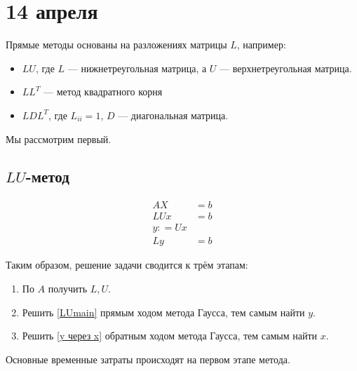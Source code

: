 \chapter{14 апреля}

Прямые методы основаны на разложениях матрицы \(L\), например:
\begin{itemize}
    \item \(LU\), где \(L\) --- нижнетреугольная матрица, а \(U\) --- верхнетреугольная матрица.
    \item \(LL^T\) --- метод квадратного корня
    \item \(LDL^T\), где \(L_{ii} = 1\), \(D\) --- диагональная матрица.
\end{itemize}

Мы рассмотрим первый.

\section{\(LU\)-метод}

\begin{align}
    A X & = b                    \\
    LUx & = b                    \\
    y : = Ux   \label{y через x} \\
    Ly  & = b \label{LUmain}
\end{align}

Таким образом, решение задачи сводится к трём этапам:
\begin{enumerate}
    \item По \(A\) получить \(L, U\).
    \item Решить \eqref{LUmain} прямым ходом метода Гаусса, тем самым найти \(y\).
    \item Решить \eqref{y через x} обратным ходом метода Гаусса, тем самым найти \(x\).
\end{enumerate}

Основные временные затраты происходят на первом этапе метода.

